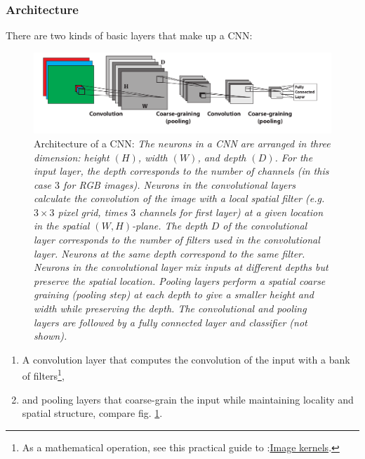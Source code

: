 \subsubsection{Architecture}
There are two kinds of basic layers that make up a CNN:

\begin{figure}[h!]
	\centering
	\includegraphics[width=0.8\linewidth]{gfx/cnn}
	\caption{Architecture of a CNN: \itshape The neurons in a CNN are arranged in three dimension: height $(H)$, width $(W)$, and depth $(D)$. For the input layer, the depth corresponds to the  number of channels (in this case $3$ for RGB images). Neurons in the convolutional layers calculate the convolution of the image with a local spatial filter (e.g. $3\times 3$ pixel grid, times $3$ channels for first layer) at a given location in the spatial $(W,H)$-plane. The depth $D$ of the convolutional layer corresponds to the number of filters used in the convolutional layer. Neurons at the same depth correspond to the same filter. Neurons in the convolutional layer mix inputs at different depths but preserve the spatial location. Pooling layers perform a spatial coarse graining (pooling step) at each depth to give a smaller height and width while preserving the depth. The convolutional and pooling layers are followed by a fully connected layer and classifier (not shown).}
	\label{fig:cnn}
\end{figure}

\begin{enumerate}
\item A convolution layer that computes the convolution of the input with a bank of filters\footnote{As a mathematical operation, see this practical guide to :\href{http://setosa.io/ev/image-kernels}{Image kernels}.},
\item and pooling layers that coarse-grain the input while maintaining locality and spatial structure, compare fig. \ref{fig:cnn}.
\end{enumerate}

